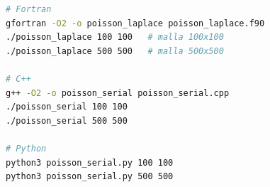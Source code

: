 \documentclass[12pt, a4paper]{article}
\begin{document}
\begin{lstlisting}[language=bash, basicstyle=\ttfamily\small,
  backgroundcolor=\color{codebg}, frame=single, framerule=0.5pt,
  rulecolor=\color{codeframe}, numbers=none,
  caption={Compilación y ejecución de los tres códigos.}]
# Fortran
gfortran -O2 -o poisson_laplace poisson_laplace.f90
./poisson_laplace 100 100   # malla 100x100
./poisson_laplace 500 500   # malla 500x500

# C++
g++ -O2 -o poisson_serial poisson_serial.cpp
./poisson_serial 100 100
./poisson_serial 500 500

# Python
python3 poisson_serial.py 100 100
python3 poisson_serial.py 500 500
\end{lstlisting}
\end{document}
